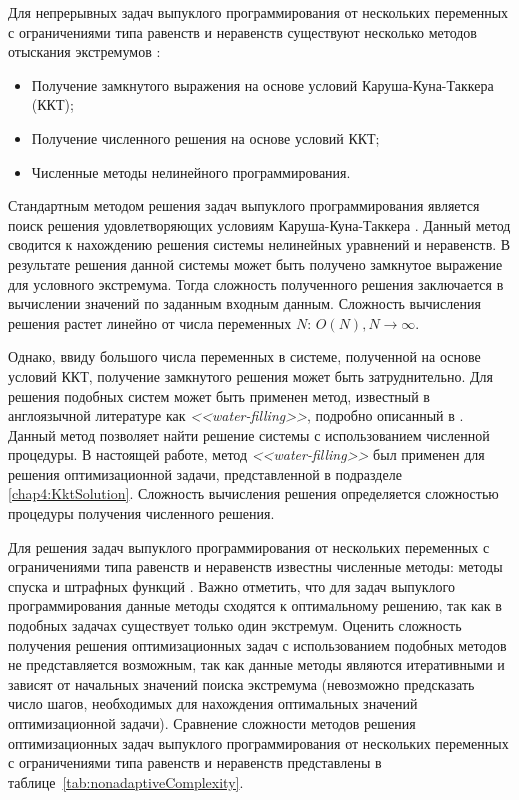 Для непрерывных задач выпуклого программирования от нескольких переменных с ограничениями типа равенств и неравенств существуют несколько методов отыскания экстремумов \cite{convex_opt,optimizations_methods}:
\begin{itemize}
	\item Получение замкнутого выражения на основе условий Каруша-Куна-Таккера (ККТ);
	\item Получение численного решения на основе условий ККТ;
	\item Численные методы нелинейного программирования.
\end{itemize}

Стандартным методом решения задач выпуклого программирования является поиск решения удовлетворяющих условиям Каруша-Куна-Таккера \cite{convex_opt,optimizations_methods}. Данный метод сводится к нахождению решения системы нелинейных уравнений и неравенств. В результате решения данной системы может быть получено замкнутое выражение для условного экстремума. Тогда сложность полученного решения заключается в вычислении значений по заданным входным данным. Сложность вычисления решения растет линейно от числа переменных $N$: $O(N), N\to\infty$.

Однако, ввиду большого числа переменных в системе, полученной на основе условий ККТ, получение замкнутого решения может быть затруднительно. Для решения подобных систем может быть применен метод, известный в англоязычной литературе как \textit{<<water-filling>>}, подробно описанный в \cite{convex_opt}. Данный метод позволяет найти решение системы с использованием численной процедуры. В настоящей работе, метод \textit{<<water-filling>>} был применен для решения оптимизационной задачи, представленной в подразделе \ref{chap4:KktSolution}. Сложность вычисления решения определяется сложностью процедуры получения численного решения.

Для решения задач выпуклого программирования от нескольких переменных с ограничениями типа равенств и неравенств известны численные методы: методы спуска и штрафных функций \cite{optimizations_methods}. Важно отметить, что для задач выпуклого программирования данные методы сходятся к оптимальному решению, так как в подобных задачах существует только один экстремум. Оценить сложность получения решения оптимизационных задач с использованием подобных методов не представляется возможным, так как данные методы являются итеративными и зависят от начальных значений поиска экстремума (невозможно предсказать число шагов, необходимых для нахождения оптимальных значений оптимизационной задачи). Сравнение сложности методов решения оптимизационных задач выпуклого программирования от нескольких переменных с ограничениями типа равенств и неравенств представлены в таблице~\ref{tab:nonadaptiveComplexity}.

